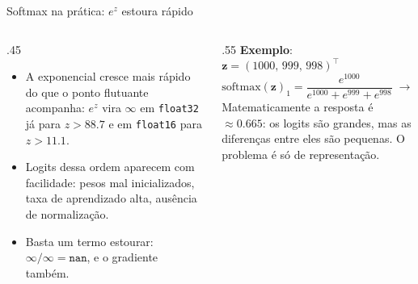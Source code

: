 \documentclass[aspectratio=169,xcolor=dvipsnames]{beamer}
\begin{document}
  \begin{frame}{Softmax na prática: $e^{z}$ estoura rápido}
    \begin{columns}[T]
      \begin{column}{.45\linewidth}
        \begin{itemize}
          \item A exponencial cresce mais rápido do que o ponto flutuante acompanha:
            $e^{z}$ vira $\infty$ em \texttt{float32} já para $z > 88.7$ e em
            \texttt{float16} para $z > 11.1$.
          \item Logits dessa ordem aparecem com facilidade: pesos mal inicializados,
            taxa de aprendizado alta, ausência de normalização.
          \item Basta um termo estourar: $\infty/\infty = \texttt{nan}$, e o gradiente também.
        \end{itemize}
      \end{column}
      \begin{column}{.55\linewidth}
        \centering
        \textbf{Exemplo}: $\mathbf{z} = (1000,\, 999,\, 998)^{\top}$
        \[
          \mathrm{softmax}(\mathbf{z})_1 = \frac{e^{1000}}{e^{1000}+e^{999}+e^{998}}
          \;\to\; \frac{\infty}{\infty} = \texttt{nan}
        \]
        {\footnotesize Matematicamente a resposta é $\approx 0.665$: os logits são grandes,
        mas as diferenças entre eles são pequenas. O problema é só de representação.}
      \end{column}
    \end{columns}
  \end{frame}
\end{document}
